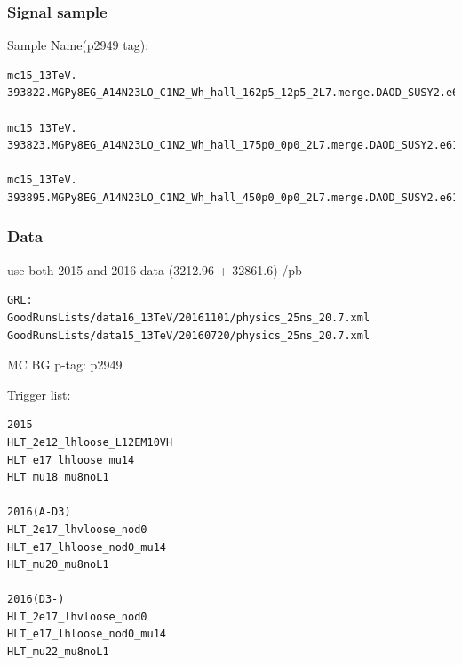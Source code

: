 \documentclass[mathserif,serif]{beamer}
\begin{document}
\begin{frame}[fragile]
\frametitle{Signal sample}
\small
Sample Name(p2949 tag):
\tiny
\begin{verbatim}
mc15_13TeV.
393822.MGPy8EG_A14N23LO_C1N2_Wh_hall_162p5_12p5_2L7.merge.DAOD_SUSY2.e6153_a766_a821_r7676_p2949

mc15_13TeV.
393823.MGPy8EG_A14N23LO_C1N2_Wh_hall_175p0_0p0_2L7.merge.DAOD_SUSY2.e6153_a766_a821_r7676_p2949

mc15_13TeV.
393895.MGPy8EG_A14N23LO_C1N2_Wh_hall_450p0_0p0_2L7.merge.DAOD_SUSY2.e6153_a766_a821_r7676_p2949
\end{verbatim}
\end{frame}

\begin{frame}[fragile]
\frametitle{Data}
\small
use both 2015 and 2016 data (3212.96 + 32861.6) /pb
\tiny
\begin{verbatim}
GRL:
GoodRunsLists/data16_13TeV/20161101/physics_25ns_20.7.xml
GoodRunsLists/data15_13TeV/20160720/physics_25ns_20.7.xml
\end{verbatim}
\end{frame}

\begin{frame}{MC BG}
p-tag: p2949
\end{frame}

\begin{frame}[fragile]
\small
Trigger list:\\
\scriptsize
\begin{verbatim}
2015
HLT_2e12_lhloose_L12EM10VH
HLT_e17_lhloose_mu14
HLT_mu18_mu8noL1

2016(A-D3)
HLT_2e17_lhvloose_nod0
HLT_e17_lhloose_nod0_mu14
HLT_mu20_mu8noL1

2016(D3-)
HLT_2e17_lhvloose_nod0
HLT_e17_lhloose_nod0_mu14
HLT_mu22_mu8noL1
\end{verbatim}
\end{frame}
\end{document}
